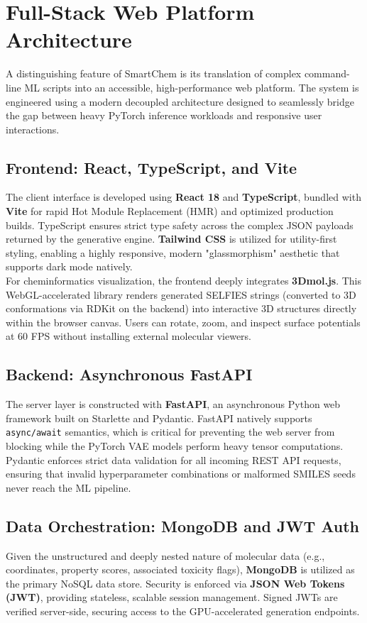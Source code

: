 \documentclass[12pt,a4paper]{report}
\begin{document}
\section{Full-Stack Web Platform Architecture}

A distinguishing feature of SmartChem is its translation of complex command-line ML scripts into an accessible, high-performance web platform. The system is engineered using a modern decoupled architecture designed to seamlessly bridge the gap between heavy PyTorch inference workloads and responsive user interactions.

\subsection{Frontend: React, TypeScript, and Vite}
The client interface is developed using \textbf{React 18} and \textbf{TypeScript}, bundled with \textbf{Vite} for rapid Hot Module Replacement (HMR) and optimized production builds. TypeScript ensures strict type safety across the complex JSON payloads returned by the generative engine. \textbf{Tailwind CSS} is utilized for utility-first styling, enabling a highly responsive, modern "glassmorphism" aesthetic that supports dark mode natively.\\

For cheminformatics visualization, the frontend deeply integrates \textbf{3Dmol.js}. This WebGL-accelerated library renders generated SELFIES strings (converted to 3D conformations via RDKit on the backend) into interactive 3D structures directly within the browser canvas. Users can rotate, zoom, and inspect surface potentials at 60 FPS without installing external molecular viewers.

\subsection{Backend: Asynchronous FastAPI}
The server layer is constructed with \textbf{FastAPI}, an asynchronous Python web framework built on Starlette and Pydantic. FastAPI natively supports \texttt{async/await} semantics, which is critical for preventing the web server from blocking while the PyTorch VAE models perform heavy tensor computations. Pydantic enforces strict data validation for all incoming REST API requests, ensuring that invalid hyperparameter combinations or malformed SMILES seeds never reach the ML pipeline.

\subsection{Data Orchestration: MongoDB and JWT Auth}
Given the unstructured and deeply nested nature of molecular data (e.g., coordinates, property scores, associated toxicity flags), \textbf{MongoDB} is utilized as the primary NoSQL data store. Security is enforced via \textbf{JSON Web Tokens (JWT)}, providing stateless, scalable session management. Signed JWTs are verified server-side, securing access to the GPU-accelerated generation endpoints.
\end{document}
